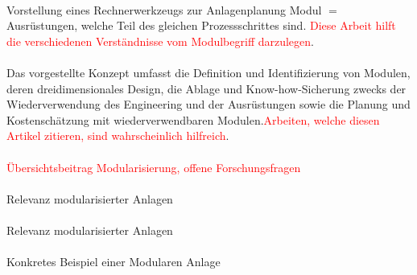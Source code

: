 \paragraph*{\cite{Kampczyk_2003}}
Vorstellung eines Rechnerwerkzeugs zur Anlagenplanung \hfill \newline
Modul $=$ Ausr\"ustungen, welche Teil des gleichen Prozessschrittes sind. \textcolor{red}{Diese Arbeit hilft die verschiedenen Verst\"andnisse vom Modulbegriff darzulegen}.

\paragraph*{\cite{Hady_2012}}
Das vorgestellte Konzept umfasst die Definition und Identifizierung von Modulen, deren dreidimensionales Design, die Ablage und Know-how-Sicherung zwecks der Wiederverwendung des Engineering und der Ausrüstungen sowie die Planung und Kostenschätzung mit wiederverwendbaren Modulen.\textcolor{red}{Arbeiten, welche diesen Artikel zitieren, sind wahrscheinlich hilfreich}.

\paragraph*{\cite{Urbas_2012}} \textcolor{red}{\"Ubersichtsbeitrag Modularisierung, offene Forschungsfragen}

\paragraph*{\cite{Lier_2016}} Relevanz modularisierter Anlagen

\paragraph*{\cite{Obst_2013}} Relevanz modularisierter Anlagen

\paragraph*{\cite{Ohle_2014}} Konkretes Beispiel einer Modularen Anlage

